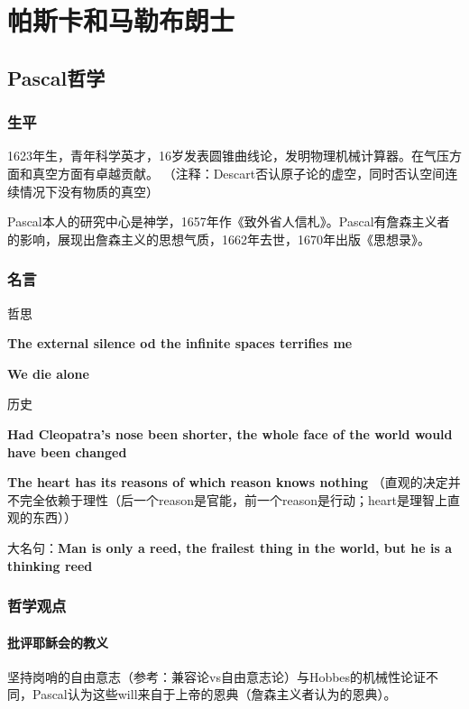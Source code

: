\section{帕斯卡和马勒布朗士}

\subsection{Pascal哲学}

\subsubsection{生平}

1623年生，青年科学英才，16岁发表圆锥曲线论，发明物理机械计算器。在气压方面和真空方面有卓越贡献。
（注释：Descart否认原子论的虚空，同时否认空间连续情况下没有物质的真空）

Pascal本人的研究中心是神学，1657年作《致外省人信札》。Pascal有詹森主义者的影响，展现出詹森主义的思想气质，1662年去世，1670年出版《思想录》。

\subsubsection{名言}
哲思

\textbf{The external silence od the infinite spaces terrifies me}

\textbf{We die alone}

历史

\textbf{Had Cleopatra's nose been shorter, the whole face of the world would have been changed}

\textbf{The heart has its reasons of which reason knows nothing} （直观的决定并不完全依赖于理性（后一个reason是官能，前一个reason是行动；heart是理智上直观的东西））

大名句：\textbf{Man is only a reed, the frailest thing in the world, but he is a thinking reed}

\subsubsection{哲学观点}

\paragraph{批评耶稣会的教义}

坚持岗哨的自由意志（参考：兼容论vs自由意志论）与Hobbes的机械性论证不同，Pascal认为这些will来自于上帝的恩典（詹森主义者认为的恩典）。

